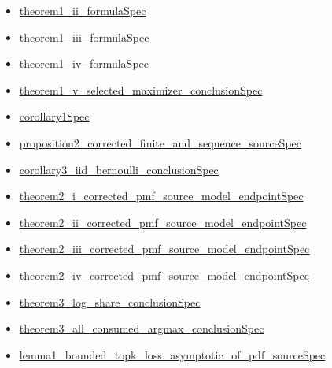 \documentclass[10pt]{article}
\begin{document}
\begin{itemize}[leftmargin=1.2em]
\begin{itemize}[leftmargin=1.2em]
\item \hyperlink{source-claim-8765a3b8d5c11957}{theorem1\_\allowbreak{}ii\_\allowbreak{}formula\allowbreak{}Spec}
\item \hyperlink{source-claim-378eee8a78b6ada4}{theorem1\_\allowbreak{}iii\_\allowbreak{}formula\allowbreak{}Spec}
\item \hyperlink{source-claim-cc5ff6e8390a6049}{theorem1\_\allowbreak{}iv\_\allowbreak{}formula\allowbreak{}Spec}
\item \hyperlink{source-claim-846cffa9077c1769}{theorem1\_\allowbreak{}v\_\allowbreak{}selected\_\allowbreak{}maximizer\_\allowbreak{}conclusion\allowbreak{}Spec}
\item \hyperlink{source-claim-e7ae4618a91038ee}{corollary1\allowbreak{}Spec}
\item \hyperlink{source-claim-e58423f2214d3283}{proposition2\_\allowbreak{}corrected\_\allowbreak{}finite\_\allowbreak{}and\_\allowbreak{}sequence\_\allowbreak{}source\allowbreak{}Spec}
\item \hyperlink{source-claim-f61ea0b8a68fcc23}{corollary3\_\allowbreak{}iid\_\allowbreak{}bernoulli\_\allowbreak{}conclusion\allowbreak{}Spec}
\item \hyperlink{source-claim-04c6588920268e32}{theorem2\_\allowbreak{}i\_\allowbreak{}corrected\_\allowbreak{}pmf\_\allowbreak{}source\_\allowbreak{}model\_\allowbreak{}endpoint\allowbreak{}Spec}
\item \hyperlink{source-claim-6ff5481408fce970}{theorem2\_\allowbreak{}ii\_\allowbreak{}corrected\_\allowbreak{}pmf\_\allowbreak{}source\_\allowbreak{}model\_\allowbreak{}endpoint\allowbreak{}Spec}
\item \hyperlink{source-claim-3057a09badb30d45}{theorem2\_\allowbreak{}iii\_\allowbreak{}corrected\_\allowbreak{}pmf\_\allowbreak{}source\_\allowbreak{}model\_\allowbreak{}endpoint\allowbreak{}Spec}
\item \hyperlink{source-claim-49b00f2a87213781}{theorem2\_\allowbreak{}iv\_\allowbreak{}corrected\_\allowbreak{}pmf\_\allowbreak{}source\_\allowbreak{}model\_\allowbreak{}endpoint\allowbreak{}Spec}
\item \hyperlink{source-claim-149ee4bef168eff6}{theorem3\_\allowbreak{}log\_\allowbreak{}share\_\allowbreak{}conclusion\allowbreak{}Spec}
\item \hyperlink{source-claim-a9a6608e74ff7dd3}{theorem3\_\allowbreak{}all\_\allowbreak{}consumed\_\allowbreak{}argmax\_\allowbreak{}conclusion\allowbreak{}Spec}
\item \hyperlink{source-claim-e8b459af037ff529}{lemma1\_\allowbreak{}bounded\_\allowbreak{}topk\_\allowbreak{}loss\_\allowbreak{}asymptotic\_\allowbreak{}of\_\allowbreak{}pdf\_\allowbreak{}source\allowbreak{}Spec}

\end{itemize}
\end{itemize}
\end{document}
